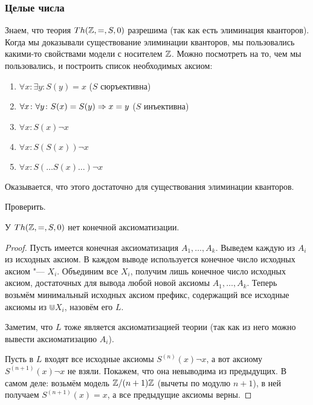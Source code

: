 \subsubsection{Целые числа}
Знаем, что теория $Th(\mathbb{Z}, =, S, 0)$ разрешима (так как есть элиминация кванторов).
Когда мы доказывали существование элиминации кванторов, мы пользовались какими-то
свойствами модели с носителем $\mathbb{Z}$.
Можно посмотреть на то, чем мы пользовались, и построить список необходимых аксиом:
\begin{enumerate}
	\item $\forall x \colon \exists y \colon S(y)=x$ ($S$ сюръективна)
	\item $\forall x \colon \forall y \colon S(x) = S(y) \Rightarrow x = y$ ($S$ инъективна)
	\item $\forall x \colon S(x) \lnot x$
	\item $\forall x \colon S(S(x)) \lnot x$
	\item $\forall x \colon S(\dots S(x) \dots) \lnot x$
\end{enumerate}
Оказывается, что этого достаточно для существования элиминации кванторов.
\begin{Exercise}
	Проверить.
\end{Exercise}

\begin{theorem}
	У $Th(\mathbb{Z}, =, S, 0)$ нет конечной аксиоматизации.
\end{theorem}
\begin{proof}
	Пусть имеется конечная аксиоматизация $A_1, \dots, A_k$.
	Выведем каждую из $A_i$ из исходных аксиом.
	В каждом выводе используется конечное число исходных аксиом "--- $X_i$.
	Объединим все $X_i$, получим лишь конечное число исходных аксиом,
	достаточных для вывода любой новой аксиомы $A_1, \dots, A_k$.
	Теперь возьмём минимальный исходных аксиом префикс, содержащий все исходные аксиомы из $\Cup X_i$,
	назовём его $L$.

	Заметим, что $L$ тоже является аксиоматизацией теории (так как из него можно вывести
	аксиоматизацию $A_i$).

	Пусть в $L$ входят все исходные аксиомы $S^{(n)}(x) \lnot x$, а вот аксиому $S^{(n+1)}(x) \lnot x$ не взяли.
	Покажем, что она невыводима из предыдущих.
	В самом деле: возьмём модель $\mathbb{Z}/(n+1)\mathbb{Z}$ (вычеты по модулю $n+1$), в ней получаем $S^{(n+1)}(x) = x$,
	а все предыдущие аксиомы верны.
\end{proof}

